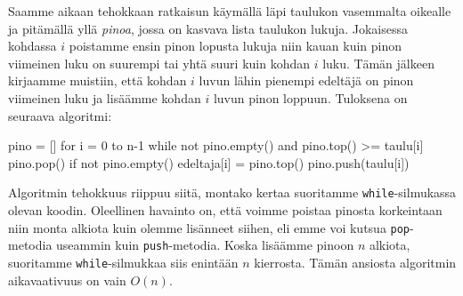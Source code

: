 Saamme aikaan tehokkaan ratkaisun käymällä läpi taulukon
vasemmalta oikealle ja pitämällä yllä \emph{pinoa}, jossa on
kasvava lista taulukon lukuja.
Jokaisessa kohdassa $i$ poistamme ensin pinon lopusta lukuja
niin kauan kuin pinon viimeinen luku on suurempi tai yhtä
suuri kuin kohdan $i$ luku.
Tämän jälkeen kirjaamme muistiin, että kohdan $i$ luvun
lähin pienempi edeltäjä on pinon viimeinen luku ja
lisäämme kohdan $i$ luvun pinon loppuun.
Tuloksena on seuraava algoritmi:

\begin{code}
pino = []
for i = 0 to n-1
    while not pino.empty() and pino.top() >= taulu[i]
        pino.pop()
    if not pino.empty()
        edeltaja[i] = pino.top()
    pino.push(taulu[i])
\end{code}


Algoritmin tehokkuus riippuu siitä, montako kertaa suoritamme
\texttt{while}-silmukassa olevan koodin.
Oleellinen havainto on, että voimme poistaa pinosta
korkeintaan niin monta alkiota kuin olemme lisänneet siihen,
eli emme voi kutsua \texttt{pop}-metodia useammin kuin \texttt{push}-metodia.
Koska lisäämme pinoon $n$ alkiota, suoritamme \texttt{while}-silmukkaa
siis enintään $n$ kierrosta.
Tämän ansiosta algoritmin aikavaativuus on vain $O(n)$.
